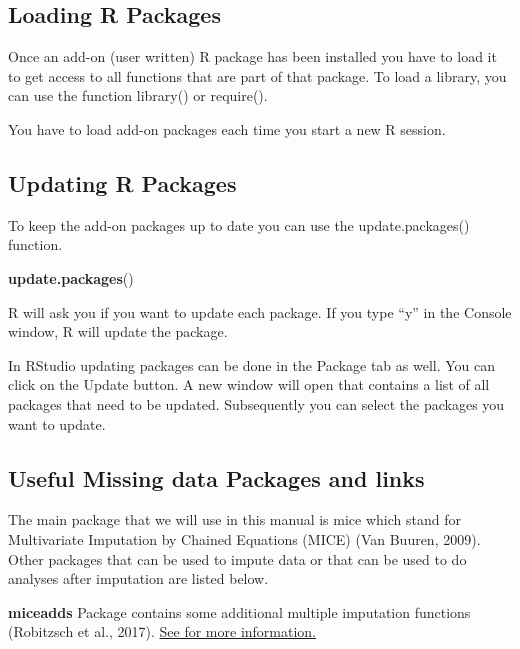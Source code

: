 \documentclass[]{book}
\newenvironment{Shaded}{\begin{snugshade}}{\end{snugshade}}
\newcommand{\KeywordTok}[1]{\textcolor[rgb]{0.13,0.29,0.53}{\textbf{#1}}}
\newcommand{\NormalTok}[1]{#1}
\begin{document}
\subsection{Loading R Packages}\label{loading-r-packages}

Once an add-on (user written) R package has been installed you have to
load it to get access to all functions that are part of that package. To
load a library, you can use the function library() or require().

You have to load add-on packages each time you start a new R session.

\subsection{Updating R Packages}\label{updating-r-packages}

To keep the add-on packages up to date you can use the update.packages()
function.

\begin{Shaded}
\begin{Highlighting}[]
\KeywordTok{update.packages}\NormalTok{()}
\end{Highlighting}
\end{Shaded}

R will ask you if you want to update each package. If you type ``y'' in
the Console window, R will update the package.

In RStudio updating packages can be done in the Package tab as well. You
can click on the Update button. A new window will open that contains a
list of all packages that need to be updated. Subsequently you can
select the packages you want to update.

\subsection{Useful Missing data Packages and
links}\label{useful-missing-data-packages-and-links}

The main package that we will use in this manual is mice which stand for
Multivariate Imputation by Chained Equations (MICE) (Van Buuren, 2009).
Other packages that can be used to impute data or that can be used to do
analyses after imputation are listed below.

\textbf{miceadds} Package contains some additional multiple imputation
functions (Robitzsch et al., 2017).
\href{https://cran.r-project.org/web/packages/miceadds/index.html}{See
for more information.}
\end{document}
